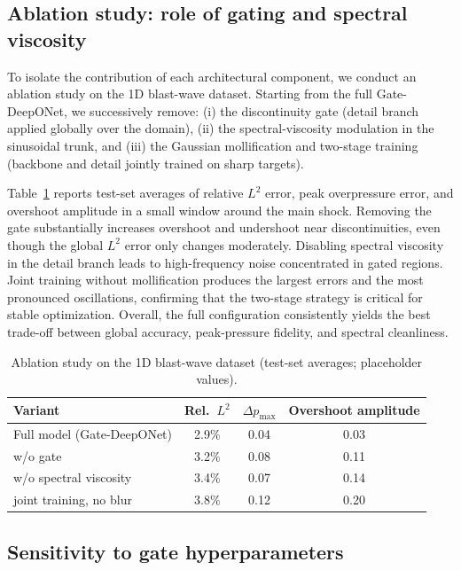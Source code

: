 \documentclass[a4paper,fleqn]{cas-dc}
\begin{document}
\subsection{Ablation study: role of gating and spectral viscosity}
\label{sec:ablation}

To isolate the contribution of each architectural component, we conduct an
ablation study on the 1D blast-wave dataset. Starting from the full
Gate-DeepONet, we successively remove:
(i) the discontinuity gate (detail branch applied globally over the domain),
(ii) the spectral-viscosity modulation in the sinusoidal trunk, and
(iii) the Gaussian mollification and two-stage training (backbone and
detail jointly trained on sharp targets).

Table~\ref{tab:ablation} reports test-set averages of relative $L^2$ error,
peak overpressure error, and overshoot amplitude in a small window around
the main shock. Removing the gate substantially increases overshoot and
undershoot near discontinuities, even though the global $L^2$ error only
changes moderately. Disabling spectral viscosity in the detail branch leads
to high-frequency noise concentrated in gated regions. Joint training
without mollification produces the largest errors and the most pronounced
oscillations, confirming that the two-stage strategy is critical for stable
optimization. Overall, the full configuration consistently yields the best
trade-off between global accuracy, peak-pressure fidelity, and spectral
cleanliness.

\begin{table}[t]
\caption{Ablation study on the 1D blast-wave dataset
(test-set averages; placeholder values).}
\label{tab:ablation}
\begin{tabular*}{\tblwidth}{@{}lccc@{}}
\toprule
Variant & Rel.\ $L^2$ & $\Delta p_{\max}$ & Overshoot amplitude \\
\midrule
Full model (Gate-DeepONet) & 2.9\% & 0.04 & 0.03 \\
w/o gate                    & 3.2\% & 0.08 & 0.11 \\
w/o spectral viscosity      & 3.4\% & 0.07 & 0.14 \\
joint training, no blur     & 3.8\% & 0.12 & 0.20 \\
\bottomrule
\end{tabular*}
\end{table}

\subsection{Sensitivity to gate hyperparameters}
\label{sec:gate-sensitivity}
\end{document}
